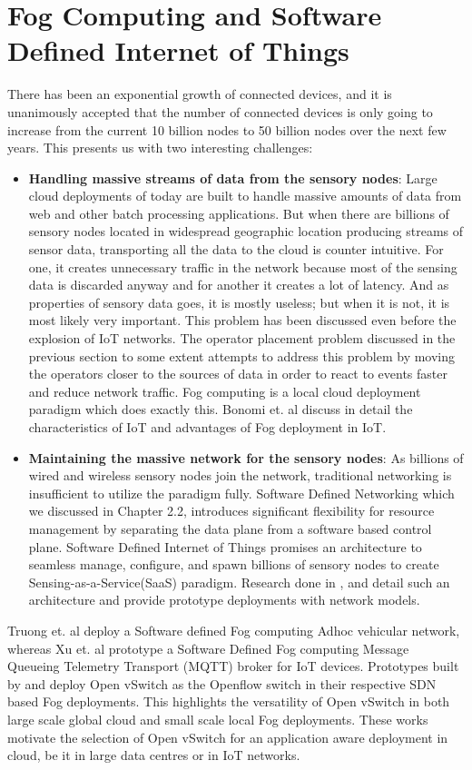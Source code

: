 \section{Fog Computing and Software Defined Internet of Things}
There has been an exponential growth of connected devices, and it is unanimously accepted that the number of connected devices is only going to increase from the current 10 billion nodes to 50 billion nodes over the next few years. This presents us with two interesting challenges: 
\begin{itemize}
\item \textbf{Handling massive streams of data from the sensory nodes}: Large cloud deployments of today are built to handle massive amounts of data from web and other batch processing applications. But when there are billions of sensory nodes located in widespread geographic location producing streams of sensor data, transporting all the data to the cloud is counter intuitive. For one, it creates unnecessary traffic in the network because most of the sensing data is discarded anyway and for another it creates a lot of latency. And as properties of sensory data goes, it is mostly useless; but when it is not, it is most likely very important. This problem has been discussed even before the explosion of IoT networks. The operator placement problem discussed in the previous section to some extent attempts to address this problem by moving the operators closer to the sources of data in order to react to events faster and reduce network traffic. Fog computing is a local cloud deployment paradigm which does exactly this. Bonomi et. al \cite{bonomi2012fog} discuss in detail the characteristics of IoT and advantages of Fog deployment in IoT. 
\item \textbf{Maintaining the massive network for the sensory nodes}: As billions of wired and wireless sensory nodes join the network, traditional networking is insufficient to utilize the paradigm fully. Software Defined Networking which we discussed in Chapter 2.2, introduces significant flexibility for resource management by separating the data plane from a software based control plane. Software Defined Internet of Things promises an architecture to seamless manage, configure, and spawn billions of sensory nodes to create Sensing-as-a-Service(SaaS) paradigm. Research done in \cite{el2015software} , \cite{qin2014software} and \cite{flauzac2015sdn} detail such an architecture and provide prototype deployments with network models.
\end{itemize}	
Truong et. al \cite{truong2015software} deploy a Software defined Fog computing Adhoc vehicular network, whereas Xu et. al \cite{xu2016towards}  prototype a Software Defined Fog computing Message Queueing Telemetry Transport (MQTT) broker for IoT devices. Prototypes built by \cite{xu2016towards} and \cite{flauzac2015sdn} deploy Open vSwitch as the Openflow switch in their respective SDN based Fog deployments. This highlights the versatility of Open vSwitch in both large scale global cloud and small scale local Fog deployments. These works motivate the selection of Open vSwitch for an application aware deployment in cloud, be it in large data centres or in IoT networks.

